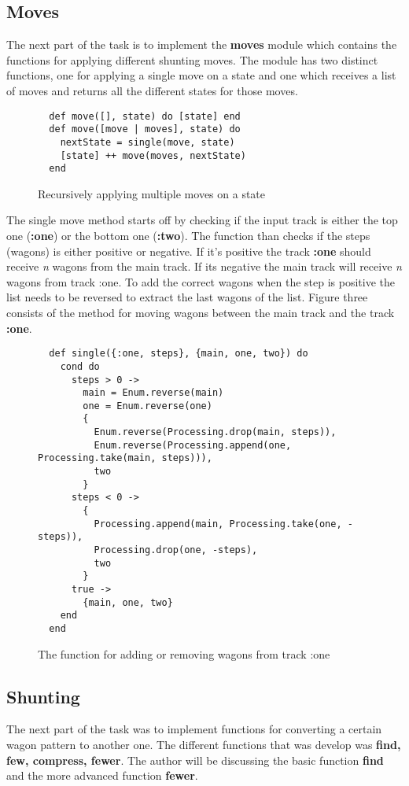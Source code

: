 \documentclass[a4paper,11pt]{article}
\begin{document}
\subsection*{Moves}
The next part of the task is to implement the \textbf{moves} module which contains the functions for applying different shunting moves. The module has two distinct functions, one for applying a single move on a state and one which receives a list of moves and returns all the different states for those moves.

\begin{figure}[H]
\begin{verbatim}
  def move([], state) do [state] end
  def move([move | moves], state) do
    nextState = single(move, state)
    [state] ++ move(moves, nextState)
  end
\end{verbatim}
\caption{Recursively applying multiple moves on a state}
\label{Figure:2}
\end{figure}

The single move method starts off by checking if the input track is either the top one (\textbf{:one}) or the bottom one (\textbf{:two}). The function than checks if the steps (wagons) is either positive or negative. If it’s positive the track \textbf{:one} should receive \textit{n} wagons from the main track. If its negative the main track will receive \textit{n} wagons from track :one. To add the correct wagons when the step is positive the list needs to be reversed to extract the last wagons of the list. Figure three consists of the method for moving wagons between the main track and the track \textbf{:one}.

\begin{figure}[H]
\begin{verbatim}
  def single({:one, steps}, {main, one, two}) do
    cond do
      steps > 0 ->
        main = Enum.reverse(main)
        one = Enum.reverse(one)
        {
          Enum.reverse(Processing.drop(main, steps)),
          Enum.reverse(Processing.append(one, Processing.take(main, steps))),
          two
        }
      steps < 0 ->
        {
          Processing.append(main, Processing.take(one, -steps)),
          Processing.drop(one, -steps),
          two
        }
      true ->
        {main, one, two}
    end
  end
\end{verbatim}
\caption{The function for adding or removing wagons from track :one}
\label{Figure:3}
\end{figure}

\subsection*{Shunting}
The next part of the task was to implement functions for converting a certain wagon pattern to another one. The different functions that was develop was \textbf{find, few, compress, fewer}. The author will be discussing the basic function \textbf{find} and the more advanced function \textbf{fewer}.
\end{document}
